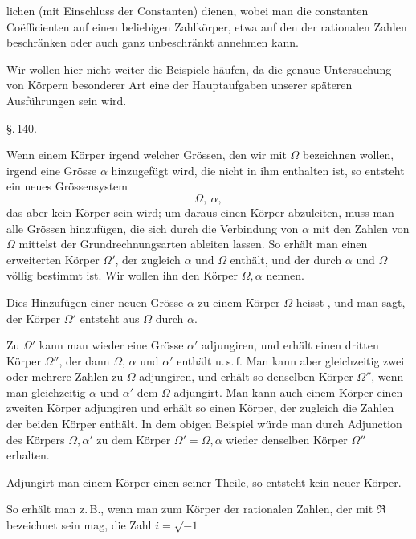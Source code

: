 lichen (mit Einschluss der Constanten) dienen, wobei man die constanten Co\"efficienten auf einen beliebigen Zahlk\"orper, etwa auf den der rationalen Zahlen beschr\"anken oder auch ganz unbeschr\"ankt annehmen kann.

Wir wollen hier nicht weiter die Beispiele h\"aufen, da die genaue Untersuchung von K\"orpern besonderer Art eine der Hauptaufgaben unserer sp\"ateren Ausf\"uhrungen sein wird.

\begin{center}
\S.\,140.

\end{center}

Wenn einem K\"orper irgend welcher Gr\"ossen, den wir mit $\Omega$ bezeichnen wollen, irgend eine Gr\"osse $\alpha$ hinzugef\"ugt wird, die nicht in ihm enthalten ist, so entsteht ein neues Gr\"ossensystem
\[
\Omega,\ \alpha,
\]
das aber kein K\"orper sein wird; um daraus einen K\"orper abzuleiten, muss man alle Gr\"ossen hinzuf\"ugen, die sich durch die Verbindung von $\alpha$ mit den Zahlen von $\Omega$ mittelst der Grundrechnungsarten ableiten lassen. So erh\"alt man einen erweiterten K\"orper $\Omega'$, der zugleich $\alpha$ und $\Omega$ enth\"alt, und der durch $\alpha$ und $\Omega$ v\"ollig bestimmt ist. Wir wollen ihn den K\"orper $\Omega, \alpha$ nennen.

Dies Hinzuf\"ugen einer neuen Gr\"osse $\alpha$ zu einem K\"orper $\Omega$ heisst , und man sagt, der K\"orper $\Omega'$ entsteht aus $\Omega$ durch  $\alpha$.

Zu $\Omega'$ kann man wieder eine Gr\"osse $\alpha'$ adjungiren, und erh\"alt einen dritten K\"orper $\Omega''$, der dann $\Omega$, $\alpha$ und $\alpha'$ enth\"alt u.\,s.\,f. Man kann aber gleichzeitig zwei oder mehrere Zahlen zu $\Omega$ adjungiren, und erh\"alt so denselben K\"orper $\Omega''$, wenn man gleichzeitig $\alpha$ und $\alpha'$ dem $\Omega$ adjungirt. Man kann auch einem K\"orper einen zweiten K\"orper adjungiren und erh\"alt so einen K\"orper, der zugleich die Zahlen der beiden K\"orper enth\"alt. In dem obigen Beispiel w\"urde man durch Adjunction des K\"orpers $\Omega, \alpha'$ zu dem K\"orper $\Omega' = \Omega, \alpha$ wieder denselben K\"orper $\Omega''$ erhalten.

Adjungirt man einem K\"orper einen seiner Theile, so entsteht kein neuer K\"orper.

So erh\"alt man z.\,B., wenn man zum K\"orper der rationalen Zahlen, der mit $\mathfrak{R}$ bezeichnet sein mag, die Zahl $i=\sqrt{-1}$
